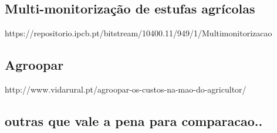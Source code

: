 \subsection{Multi-monitorização de estufas agrícolas }

https://repositorio.ipcb.pt/bitstream/10400.11/949/1/Multimonitorizacao%

\subsection{Agroopar}

http://www.vidarural.pt/agroopar-os-custos-na-mao-do-agricultor/


\subsection{outras que vale a pena para comparacao..}



\cite{Abreu2012}


\newpage










